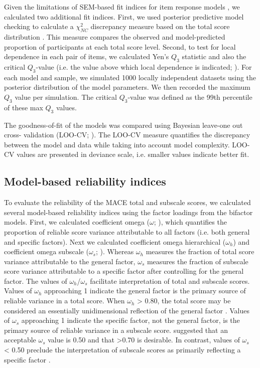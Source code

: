 \documentclass[letterpaper,man,natbib,noextraspace,floatsintext,longtable,12pt]{apa6}
\begin{document}
Given the limitations of SEM-based fit indices for item response models \citep{clark2018model}, we calculated two additional fit indices. First, we used posterior predictive model checking to calculate a $\chi^2_{NC}$ discrepancy measure based on the total score distribution \citep{sinharay2006posterior}. This measure compares the observed and model-predicted proportion of participants at each total score level. Second, to test for local dependence in each pair of items, we calculated Yen's $Q_3$ statistic \citep{yen1984effects} and also the critical $Q_3$-value (i.e. the value above which local dependence is indicated; \citealt{christensen2017critical}). For each model and sample, we simulated 1000 locally independent datasets using the posterior distribution of the model parameters. We then recorded the maximum $Q_3$ value per simulation. The critical $Q_3$-value was defined as the 99th percentile of these max $Q_3$ values. 

The goodness-of-fit of the models was compared using Bayesian leave-one out cross- validation (LOO-CV; \citealt{vehtari2017practical}). The LOO-CV measure quantifies the discrepancy between the model and data while taking into account model complexity. LOO-CV values are presented in deviance scale, i.e. smaller values indicate better fit.

\subsection{Model-based reliability indices}

To evaluate the reliability of the MACE total and subscale scores, we calculated several model-based reliability indices using the factor loadings from the bifactor models. First, we calculated coefficient omega ($\omega$; \citealt{mcdonald2013test}), which quantifies the proportion of reliable score variance attributable to all factors (i.e. both general and specific factors). Next we calculated coefficient omega hierarchical ($\omega_h$) and coefficient omega subscale ($\omega_s$;  \citealt{reise2013scoring}). Whereas $\omega_h$ measures the fraction of total score variance attributable to the general factor, $\omega_s$ measures the fraction of subscale score variance attributable to a specific factor after controlling for the general factor. The values of $\omega_h$/$\omega_s$ facilitate interpretation of total and subscale scores. Values of $\omega_h$ approaching 1 indicate the general factor is the primary source of reliable variance in a total score. When $\omega_h$ > 0.80, the total score may be considered an essentially unidimensional reflection of the general factor \citep{rodriguez2016applying}. Values of $\omega_s$ approaching 1 indicate the specific factor, not the general factor, is the primary source of reliable variance in a subscale score. \cite{canivez2016bifactor} suggested that an acceptable $\omega_s$ value is 0.50 and that >0.70 is desirable. In contrast, values of $\omega_s$ < 0.50 preclude the interpretation of subscale scores as primarily reflecting a specific factor \citep{gignac2013bifactor}. 
\end{document}
